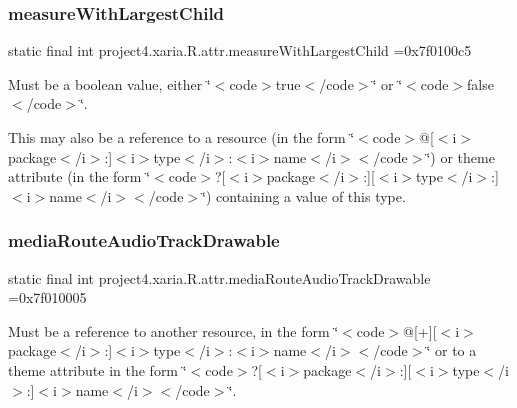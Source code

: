 \subsubsection{\texorpdfstring{measure\+With\+Largest\+Child}{measureWithLargestChild}}
{\footnotesize\ttfamily static final int project4.\+xaria.\+R.\+attr.\+measure\+With\+Largest\+Child =0x7f0100c5\hspace{0.3cm}{\ttfamily [static]}}

Must be a boolean value, either \char`\"{}$<$code$>$true$<$/code$>$\char`\"{} or \char`\"{}$<$code$>$false$<$/code$>$\char`\"{}. 

This may also be a reference to a resource (in the form \char`\"{}$<$code$>$@\mbox{[}$<$i$>$package$<$/i$>$\+:\mbox{]}$<$i$>$type$<$/i$>$\+:$<$i$>$name$<$/i$>$$<$/code$>$\char`\"{}) or theme attribute (in the form \char`\"{}$<$code$>$?\mbox{[}$<$i$>$package$<$/i$>$\+:\mbox{]}\mbox{[}$<$i$>$type$<$/i$>$\+:\mbox{]}$<$i$>$name$<$/i$>$$<$/code$>$\char`\"{}) containing a value of this type. \mbox{\label{classproject4_1_1xaria_1_1R_1_1attr_ad0a034729ca6de0e240f0df38c184644}} 
\subsubsection{\texorpdfstring{media\+Route\+Audio\+Track\+Drawable}{mediaRouteAudioTrackDrawable}}
{\footnotesize\ttfamily static final int project4.\+xaria.\+R.\+attr.\+media\+Route\+Audio\+Track\+Drawable =0x7f010005\hspace{0.3cm}{\ttfamily [static]}}

Must be a reference to another resource, in the form \char`\"{}$<$code$>$@\mbox{[}+\mbox{]}\mbox{[}$<$i$>$package$<$/i$>$\+:\mbox{]}$<$i$>$type$<$/i$>$\+:$<$i$>$name$<$/i$>$$<$/code$>$\char`\"{} or to a theme attribute in the form \char`\"{}$<$code$>$?\mbox{[}$<$i$>$package$<$/i$>$\+:\mbox{]}\mbox{[}$<$i$>$type$<$/i$>$\+:\mbox{]}$<$i$>$name$<$/i$>$$<$/code$>$\char`\"{}. \mbox{\label{classproject4_1_1xaria_1_1R_1_1attr_a78e3f143d8efbd225e623dd437d6bca7}} 
